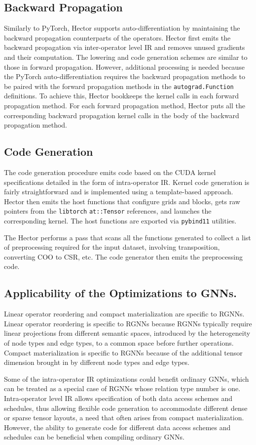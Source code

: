 \subsection{Backward Propagation}
\label{sec:bck_prop}


Similarly to PyTorch, Hector supports auto-differentiation by %
maintaining the backward propagation counterparts of the operators.
Hector first emits the backward propagation via inter-operator level IR and removes unused gradients and their computation.
The lowering and code generation schemes are similar to those in forward propagation.
However, additional processing is needed because the PyTorch auto-differentiation requires the backward propagation methods to be paired with the forward propagation methods in the \texttt{autograd.Function} definitions. To achieve this, Hector bookkeeps the kernel calls in each forward propagation method. For each forward propagation method, Hector puts all the corresponding backward propagation kernel calls in the body of the backward propagation method.


\subsection{Code Generation}
\label{sec:code_gen}
The code generation procedure emits code based on the CUDA kernel specifications detailed in the form of intra-operator IR. Kernel code generation is fairly straightforward and is implemented using a template-based approach. 
Hector then emits the host functions that configure grids and blocks, gets raw pointers from the \texttt{libtorch} \texttt{at::Tensor} references, and launches the corresponding kernel. The host functions are exported via \texttt{pybind11} utilities. 

The Hector performs a pass that scans all the functions generated to collect a list of preprocessing required for the input dataset, involving transposition, converting COO to CSR, etc. The code generator then emits the preprocessing code.


\subsection{Applicability of the Optimizations to GNNs.}\label{sec:gnn_applicability}
Linear operator reordering and compact materialization are specific to RGNNs. Linear operator reordering is specific to RGNNs because RGNNs typically require linear projections from different semantic spaces, introduced by the heterogeneity of node types and edge types, to a common space before further operations. 
Compact materialization is specific to RGNNs because of the additional tensor dimension brought in by different node types and edge types. 

Some of the intra-operator IR optimizations could benefit ordinary GNNs, which can be treated as a special case of RGNNs whose relation type number is one. Intra-operator level IR allows specification of both data access schemes and schedules, thus allowing flexible code generation to accommodate different dense or sparse tensor layouts, a need that often arises from compact materialization. However, the ability to generate code for different data access schemes and schedules can be beneficial when compiling ordinary GNNs.
